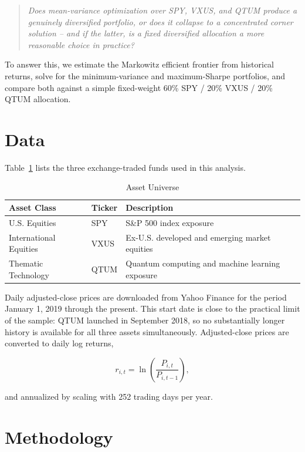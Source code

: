\documentclass[11pt]{article}
\begin{document}
\begin{quote}
\textit{Does mean-variance optimization over SPY, VXUS, and QTUM produce a
genuinely diversified portfolio, or does it collapse to a concentrated
corner solution -- and if the latter, is a fixed diversified allocation a
more reasonable choice in practice?}
\end{quote}

To answer this, we estimate the Markowitz efficient frontier from historical
returns, solve for the minimum-variance and maximum-Sharpe portfolios, and
compare both against a simple fixed-weight 60\% SPY / 20\% VXUS / 20\% QTUM
allocation.

\section{Data}

Table~\ref{tab:assets} lists the three exchange-traded funds used in this
analysis.

\begin{table}[h]
\centering
\caption{Asset Universe}
\label{tab:assets}
\begin{tabular}{@{}lll@{}}
\toprule
Asset Class & Ticker & Description \\
\midrule
U.S. Equities & SPY & S\&P 500 index exposure \\
International Equities & VXUS & Ex-U.S. developed and emerging market equities \\
Thematic Technology & QTUM & Quantum computing and machine learning exposure \\
\bottomrule
\end{tabular}
\end{table}

Daily adjusted-close prices are downloaded from Yahoo Finance for the period
January 1, 2019 through the present. This start date is close to the
practical limit of the sample: QTUM launched in September 2018, so no
substantially longer history is available for all three assets
simultaneously. Adjusted-close prices are converted to daily log returns,

\begin{equation}
r_{i,t} = \ln\left(\frac{P_{i,t}}{P_{i,t-1}}\right),
\label{eq:logreturn}
\end{equation}

and annualized by scaling with 252 trading days per year.

\section{Methodology}
\end{document}
